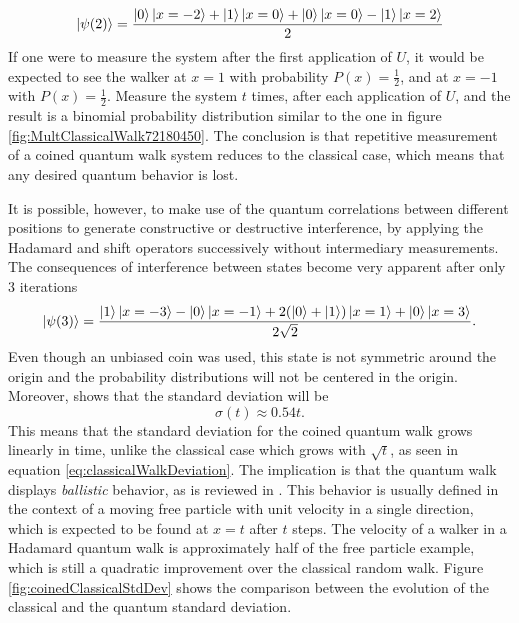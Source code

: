 \documentclass[../../dissertation.tex]{subfiles}
\begin{document}
\begin{equation}
	\ket{\psi(2)} = \frac{\ket{0}\ket{x=-2}+\ket{1}\ket{x=0}+\ket{0}\ket{x=0}-\ket{1}\ket{x=2}}{2}
\end{equation}
If one were to measure the system after the first application of $U$,
it would be expected to see the walker at $x=1$ with probability $P(x) =
\frac{1}{2}$, and at $x=-1$ with $P(x) = \frac{1}{2}$. Measure the
system $t$ times, after each application of $U$, and the result is a
binomial probability distribution similar to the one in figure
\ref{fig:MultClassicalWalk72180450}. The conclusion is that repetitive
measurement of a coined quantum walk system reduces to the classical case,
which means that any desired quantum behavior is lost. \par

It is possible, however, to make use of the quantum correlations between
different positions to generate constructive or destructive interference, by
applying the Hadamard and shift operators successively without intermediary
measurements.  The consequences of interference between states become very
apparent after only 3 iterations 
\begin{equation}
	\ket{\psi(3)} = \frac{\ket{1}\ket{x=-3}-\ket{0}\ket{x=-1}+2(\ket{0}+\ket{1})\ket{x=1}+\ket{0}\ket{x=3}}{2\sqrt{2}}\label{eq:coinedSimulThirdStep}.
\end{equation}
Even though an unbiased coin was used, this state is not symmetric around the
origin and the probability distributions will not be centered in the origin.
Moreover, \cite{childs2002} shows that the standard deviation will be
\begin{equation}
	\sigma(t) \approx 0.54t .
\end{equation}
This means that the standard deviation for the coined quantum walk grows
linearly in time, unlike the classical case which grows with $\sqrt{t}$, as seen in equation \eqref{eq:classicalWalkDeviation}. The implication is that the
quantum walk displays \textit{ballistic} behavior, as is reviewed in
\cite{andraca2012}. This behavior is usually defined in the context of a
moving free particle with unit velocity in a single direction, which is
expected to be found at $x=t$ after $t$ steps. The velocity of a walker in a
Hadamard quantum walk is approximately half of the free particle example, which
is still a quadratic improvement over the classical random walk. Figure
\ref{fig:coinedClassicalStdDev} shows the comparison between the evolution of
the classical and the quantum standard deviation.
\end{document}
